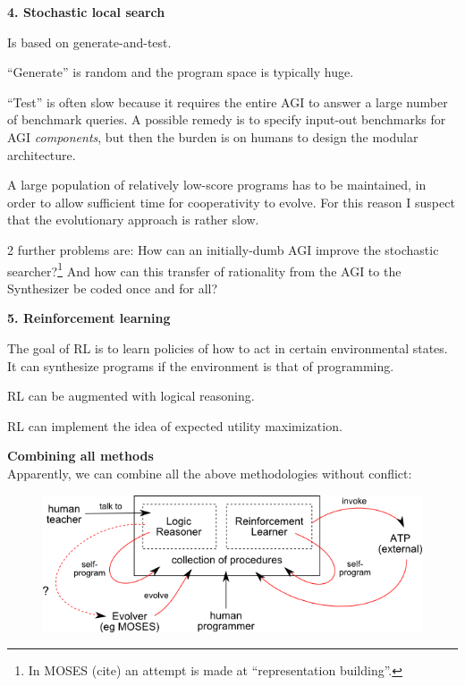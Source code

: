 \textbf{4. Stochastic local search} 
\begin{compactenum}[(a)]
\item  Is based on generate-and-test.
\item  ``Generate'' is random and the program space is typically huge.
\item  ``Test'' is often slow because it requires the entire AGI to answer a large number of benchmark queries.  A possible remedy is to specify input-out benchmarks for AGI \textit{components}, but then the burden is on humans to design the modular architecture.
\item  A large population of relatively low-score programs has to be maintained, in order to allow sufficient time for cooperativity to evolve.  For this reason I suspect that the evolutionary approach is rather slow.
\item  2 further problems are:  How can an initially-dumb AGI improve the stochastic searcher?\footnote{In MOSES (cite) an attempt is made at ``representation building''.} And how can this transfer of rationality from the AGI to the Synthesizer be coded once and for all?\\
\end{compactenum}

\textbf{5. Reinforcement learning} 
\begin{compactenum}[(a)]
\item  The goal of RL is to learn policies of how to act in certain environmental states.  It can synthesize programs if the environment is that of programming.
\item  RL can be augmented with logical reasoning.
\item  RL can implement the idea of expected utility maximization.
\\
\end{compactenum}

\textbf{Combining all methods}\\
Apparently, we can combine all the above methodologies without conflict:
\begin{figure}[H]
\centering
\includegraphics{combined-architecture.png}
\vspace{-0.5cm}
\end{figure}

